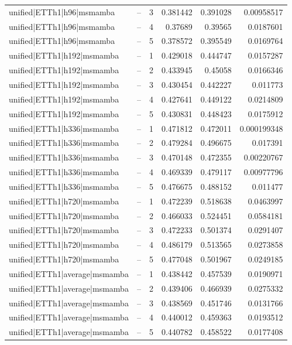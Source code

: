 \begin{longtable}{llrrrr}
unified|ETTh1|h96|msmamba & -- & 3 & 0.381442 & 0.391028 & 0.00958517 \\
unified|ETTh1|h96|msmamba & -- & 4 & 0.37689 & 0.39565 & 0.0187601 \\
unified|ETTh1|h96|msmamba & -- & 5 & 0.378572 & 0.395549 & 0.0169764 \\
unified|ETTh1|h192|msmamba & -- & 1 & 0.429018 & 0.444747 & 0.0157287 \\
unified|ETTh1|h192|msmamba & -- & 2 & 0.433945 & 0.45058 & 0.0166346 \\
unified|ETTh1|h192|msmamba & -- & 3 & 0.430454 & 0.442227 & 0.011773 \\
unified|ETTh1|h192|msmamba & -- & 4 & 0.427641 & 0.449122 & 0.0214809 \\
unified|ETTh1|h192|msmamba & -- & 5 & 0.430831 & 0.448423 & 0.0175912 \\
unified|ETTh1|h336|msmamba & -- & 1 & 0.471812 & 0.472011 & 0.000199348 \\
unified|ETTh1|h336|msmamba & -- & 2 & 0.479284 & 0.496675 & 0.017391 \\
unified|ETTh1|h336|msmamba & -- & 3 & 0.470148 & 0.472355 & 0.00220767 \\
unified|ETTh1|h336|msmamba & -- & 4 & 0.469339 & 0.479117 & 0.00977796 \\
unified|ETTh1|h336|msmamba & -- & 5 & 0.476675 & 0.488152 & 0.011477 \\
unified|ETTh1|h720|msmamba & -- & 1 & 0.472239 & 0.518638 & 0.0463997 \\
unified|ETTh1|h720|msmamba & -- & 2 & 0.466033 & 0.524451 & 0.0584181 \\
unified|ETTh1|h720|msmamba & -- & 3 & 0.472233 & 0.501374 & 0.0291407 \\
unified|ETTh1|h720|msmamba & -- & 4 & 0.486179 & 0.513565 & 0.0273858 \\
unified|ETTh1|h720|msmamba & -- & 5 & 0.477048 & 0.501967 & 0.0249185 \\
unified|ETTh1|average|msmamba & -- & 1 & 0.438442 & 0.457539 & 0.0190971 \\
unified|ETTh1|average|msmamba & -- & 2 & 0.439406 & 0.466939 & 0.0275332 \\
unified|ETTh1|average|msmamba & -- & 3 & 0.438569 & 0.451746 & 0.0131766 \\
unified|ETTh1|average|msmamba & -- & 4 & 0.440012 & 0.459363 & 0.0193512 \\
unified|ETTh1|average|msmamba & -- & 5 & 0.440782 & 0.458522 & 0.0177408 \\

\end{longtable}
